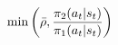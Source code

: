 \documentclass[preview]{standalone}
\begin{document}
\begin{align*}
\special{dvisvgm:raw <g id='unique000'>}\min \left(\bar{\rho},\frac{\pi_{2}(a_t|s_t)}{\pi_{1}(a_t|s_t)} \right)\special{dvisvgm:raw </g>}
\end{align*}
\end{document}
